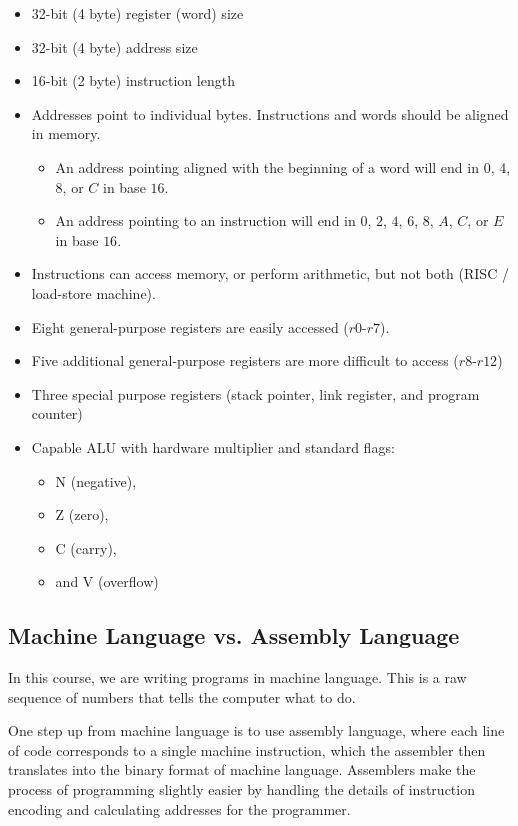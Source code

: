 \documentclass[12pt]{article}
\newcommand{\reg}[1]{$r#1$}
\begin{document}
\begin{itemize}
    \item {}32-bit (4 byte) register (word) size
    \item 32-bit (4 byte) address size
    \item 16-bit (2 byte) instruction length
    \item {}Addresses point to individual bytes.  Instructions and words should be aligned in memory.
    \begin{itemize}
        \item An address pointing aligned with the beginning of a word will end in $0$, $4$, $8$, or $C$ in base $16$.
        \item An address pointing to an instruction will end in $0$, $2$, $4$, $6$, $8$, $A$, $C$, or $E$ in base $16$.
    \end{itemize}
    \item Instructions can access memory, or perform arithmetic, but not both (RISC / load-store machine).
    \item Eight general-purpose registers are easily accessed (\reg{0}-\reg{7}).
    \item Five additional general-purpose registers are more difficult to access (\reg{8}-\reg{12})
    \item Three special purpose registers (stack pointer, link register, and program counter)
    \item Capable ALU with hardware multiplier and standard flags:
    \begin{itemize}
        \item N (negative),
        \item Z (zero),
        \item C (carry),
        \item and V (overflow)
    \end{itemize}
\end{itemize}

\subsection{Machine Language vs. Assembly Language}

In this course, we are writing programs in machine language.  This is a raw sequence of numbers that tells the computer what to do.

One step up from machine language is to use assembly language, where each line of code corresponds to a single machine instruction, which the assembler then translates into the binary format of machine language.  Assemblers make the process of programming slightly easier by handling the details of instruction encoding and calculating addresses for the programmer.
\end{document}
